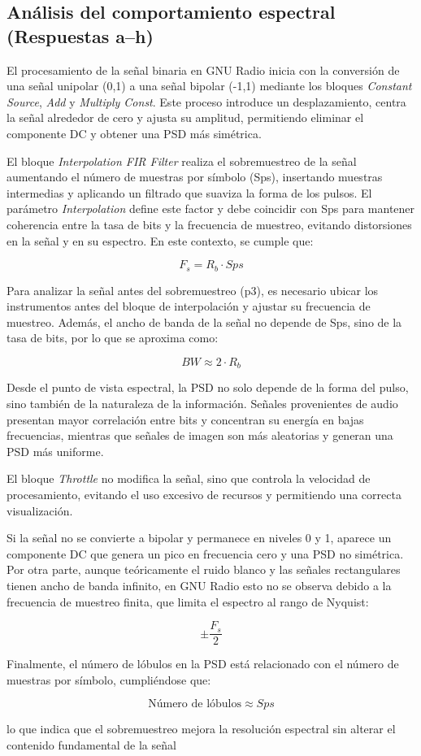 \subsection{Análisis del comportamiento espectral (Respuestas a–h)}

El procesamiento de la señal binaria en GNU Radio inicia con la conversión de una señal unipolar (0,1) a una señal bipolar (-1,1) mediante los bloques \textit{Constant Source}, \textit{Add} y \textit{Multiply Const}. Este proceso introduce un desplazamiento, centra la señal alrededor de cero y ajusta su amplitud, permitiendo eliminar el componente DC y obtener una PSD más simétrica.

El bloque \textit{Interpolation FIR Filter} realiza el sobremuestreo de la señal aumentando el número de muestras por símbolo (Sps), insertando muestras intermedias y aplicando un filtrado que suaviza la forma de los pulsos. El parámetro \textit{Interpolation} define este factor y debe coincidir con Sps para mantener coherencia entre la tasa de bits y la frecuencia de muestreo, evitando distorsiones en la señal y en su espectro. En este contexto, se cumple que:

\[
F_s = R_b \cdot Sps
\]

Para analizar la señal antes del sobremuestreo (p3), es necesario ubicar los instrumentos antes del bloque de interpolación y ajustar su frecuencia de muestreo. Además, el ancho de banda de la señal no depende de Sps, sino de la tasa de bits, por lo que se aproxima como:

\[
BW \approx 2 \cdot R_b
\]

Desde el punto de vista espectral, la PSD no solo depende de la forma del pulso, sino también de la naturaleza de la información. Señales provenientes de audio presentan mayor correlación entre bits y concentran su energía en bajas frecuencias, mientras que señales de imagen son más aleatorias y generan una PSD más uniforme.

El bloque \textit{Throttle} no modifica la señal, sino que controla la velocidad de procesamiento, evitando el uso excesivo de recursos y permitiendo una correcta visualización.

Si la señal no se convierte a bipolar y permanece en niveles 0 y 1, aparece un componente DC que genera un pico en frecuencia cero y una PSD no simétrica. Por otra parte, aunque teóricamente el ruido blanco y las señales rectangulares tienen ancho de banda infinito, en GNU Radio esto no se observa debido a la frecuencia de muestreo finita, que limita el espectro al rango de Nyquist:

\[
\pm \frac{F_s}{2}
\]

Finalmente, el número de lóbulos en la PSD está relacionado con el número de muestras por símbolo, cumpliéndose que:

\[
\text{Número de lóbulos} \approx Sps
\]

lo que indica que el sobremuestreo mejora la resolución espectral sin alterar el contenido fundamental de la señal